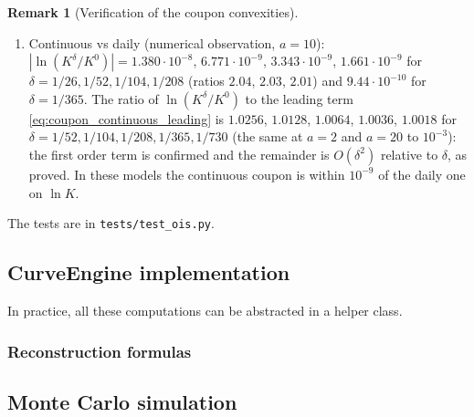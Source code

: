 \documentclass[11pt,english]{amsart}
\theoremstyle{definition}
\newtheorem{rema}{Remark}
\begin{document}
\begin{rema}[Verification of the coupon convexities]
\begin{enumerate}
\begin{center}
\begin{tabular}{|c|c|c|c|c|}
$20$ & $5.4888\cdot10^{-4}$ & $5.4899\cdot10^{-4}$ & $5.4899\cdot10^{-4}$ & $1.11\cdot10^{-7}$ \\
\hline
\end{tabular}
\end{center}
The in-arrears term is about $10^{-7}$ and roughly constant in $a$, as \autoref{prop:coupon_continuous_error} predicts (bound $\bar{\sigma}^f\bar{\sigma}^c\theta^3/3\approx3.9\cdot10^{-7}$ with $\bar{\sigma}^f\approx1.47\%$, $\bar{\sigma}^c\approx0.51\%$, the largest spot volatilities), while the Libor term grows with $a$: the in-arrears term is $0.8\%$ of the convexity at $a = 2$ and $0.06\%$ at $a = 10$. A Monte Carlo cannot resolve it: in item 2 it is $0.07$ standard errors (about $2^{28}$ paths would be needed for $4$ standard errors). The exact benchmark of item 1 resolves it ($10^{-7}$ against $4.4\cdot10^{-16}$).
\item Continuous vs daily (numerical observation, $a = 10$): $|\ln(K^\delta/K^0)| = 1.380\cdot10^{-8}$, $6.771\cdot10^{-9}$, $3.343\cdot10^{-9}$, $1.661\cdot10^{-9}$ for $\delta = 1/26, 1/52, 1/104, 1/208$ (ratios $2.04$, $2.03$, $2.01$) and $9.44\cdot10^{-10}$ for $\delta = 1/365$. The ratio of $\ln(K^\delta/K^0)$ to the leading term \eqref{eq:coupon_continuous_leading} is $1.0256$, $1.0128$, $1.0064$, $1.0036$, $1.0018$ for $\delta = 1/52, 1/104, 1/208, 1/365, 1/730$ (the same at $a = 2$ and $a = 20$ to $10^{-3}$): the first order term is confirmed and the remainder is $O(\delta^2)$ relative to $\delta$, as proved. In these models the continuous coupon is within $10^{-9}$ of the daily one on $\ln K$.
\end{enumerate}
The tests are in \texttt{tests/test\_ois.py}.
\end{rema}


\subsection{CurveEngine implementation}

In practice, all these computations can be abstracted in a helper class.

\subsubsection{Reconstruction formulas}



\newpage%
\subsection{Monte Carlo simulation}\label{ssec:lgcm_simulation}
\end{document}
